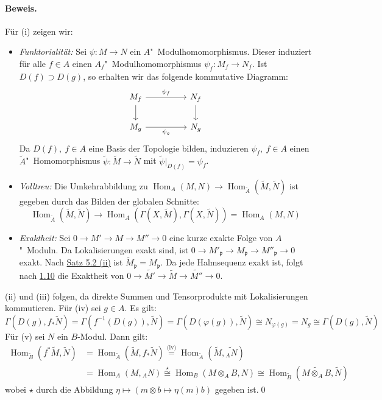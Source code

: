 \paragraph{Beweis.} Für (i) zeigen wir: \begin{itemize}
\item \textit{Funktorialität:} Sei $\psi:M\to N$ ein $A$"~Modulhomomorphismus. Dieser induziert für alle $f\in A$ einen $A_f$"~Modulhomomorphismus $\psi_f:M_f\to N_f$. Ist $D(f)\supset D(g)$, so erhalten wir das folgende kommutative Diagramm:
\[\begin{tikzcd}
M_f\ar[rr, "\psi_f"]\ar[d] && N_f\ar[d]\\
M_g\ar[rr, "\psi_g"'] && N_g
\end{tikzcd} \]
Da $D(f),\ f\in A$ eine Basis der Topologie bilden, induzieren $\psi_f,\ f\in A$ einen $\widetilde{A}$"~Homomorphismus $\widetilde{\psi}:\widetilde{M}\to\widetilde{N}$ mit $\widetilde{\psi}|_{D(f)}=\psi_f$.
\item \textit{Volltreu:} Die Umkehrabbildung zu $\operatorname{Hom}_A(M,N)\to\operatorname{Hom}_{\widetilde{A}}(\widetilde{M},\widetilde{N})$ ist gegeben durch das Bilden der globalen Schnitte:
\[\operatorname{Hom}_{\widetilde{A}}(\widetilde{M},\widetilde{N})\to\operatorname{Hom}_A(\Gamma(X,\widetilde{M}),\Gamma(X,\widetilde{N}))=\operatorname{Hom}_A(M,N)\]
\item \textit{Exaktheit:} Sei $0\to M'\to M\to M''\to 0$ eine kurze exakte Folge von $A$"~Moduln. Da Lokalisierungen exakt sind, ist $0\to M'_\mathfrak{p}\to M_\mathfrak{p}\to M''_\mathfrak{p}\to 0$ exakt. Nach \hyperref[5.2]{Satz 5.2 (ii)} ist $\widetilde{M}_\mathfrak{p}=M_\mathfrak{p}$. Da jede Halmsequenz exakt ist, folgt nach \hyperref[1.10]{1.10} die Exaktheit von $0\to\widetilde{M'}\to\widetilde{M}\to\widetilde{M''}\to 0$.
\end{itemize}
(ii) und (iii) folgen, da direkte Summen und Tensorprodukte mit Lokalisierungen kommutieren. Für (iv) sei $g\in A$. Es gilt:
\[\Gamma(D(g),f_\ast\widetilde{N}) = \Gamma(f^{-1}(D(g)),\widetilde{N}) = \Gamma(D(\varphi(g)),\widetilde{N}) \cong N_{\varphi(g)} = N_g\cong \Gamma(D(g),\widetilde{N})\]
Für (v) sei $N$ ein $B$-Modul. Dann gilt:
\begin{align*}
\operatorname{Hom}_{\widetilde{B}}(f^\ast\widetilde{M},\widetilde{N})&=\operatorname{Hom}_{\widetilde{A}}(\widetilde{M},f_\ast \widetilde{N}) \stackrel{\text{(iv)}}{=}\operatorname{Hom}_{\widetilde{A}}(\widetilde{M}, \widetilde{_AN})\\
&= \operatorname{Hom}_A(M, {_AN}) \stackrel{\star}{\cong}\operatorname{Hom}_B(M\otimes_A B,N)\cong\operatorname{Hom}_{\widetilde{B}}(\widetilde{M\otimes_A B},\widetilde{N})
\end{align*}
wobei $\star$ durch die Abbildung $\eta\mapsto (m\otimes b\mapsto \eta(m)b)$ gegeben ist.\qed

